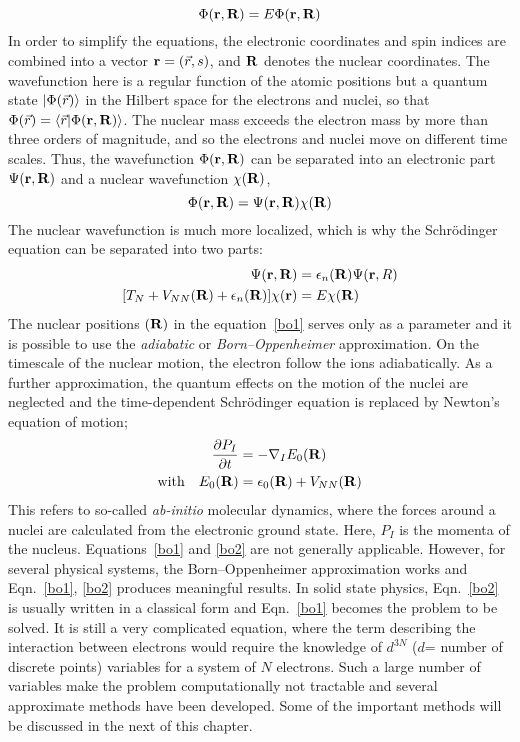 \begin{equation}
 [T_e + T_N + V_{Ne}(\vb{r},\vb{R}) + V_{ee}(\vb{r}) + V_{NN}(\vb{R})]\Phi(\vb{r},\vb{R}) = E\Phi(\vb{r},\vb{R})
\end{equation}
In order to simplify the equations, the electronic coordinates and spin indices are combined into a vector $\vb{r} = (\vec{r},s)$, and $\vb{R}$ denotes the nuclear coordinates. The wavefunction here is a regular function of the atomic positions but a quantum state $\ket{\Phi(\vec{r})}$ in the Hilbert space for the electrons and nuclei, so that \mbox{$\Phi(\vec{r}) = \braket{\vec{r}}{\Phi(\vb{r},\vb{R})}$}. The nuclear mass exceeds the electron mass by more than three orders of magnitude, and so the electrons and nuclei move on different time scales. Thus, the wavefunction $\Phi(\vb{r},\vb{R})$ can be separated into an electronic part $\Psi(\vb{r},\vb{R})$ and a nuclear wavefunction $\chi(\vb{R})$,
\begin{equation}
\Phi(\vb{r},\vb{R}) = \Psi(\vb{r},\vb{R})\chi(\vb{R})
\end{equation}
The nuclear wavefunction is much more localized, which is why the Schr\"odinger equation can be separated into two parts:
\begin{align}
[T_e + V_{ee}(\vb{r}) + V_{Ne}(\vb{r},\vb{R})]\Psi(\vb{r},\vb{R}) & = \epsilon_n(\vb{R})\Psi(\vb{r},{R})\label{bo1} \\
[T_N + V_{NN}(\vb{R}) + \epsilon_n(\vb{R})]\chi(\vb{r}) & = E\chi(\vb{R})\label{bo2}
\end{align}
The nuclear positions $(\vb{R})$ in the equation~\eqref{bo1} serves only as a parameter and it is possible to use the \textit{adiabatic} or \textit{Born--Oppenheimer} approximation. On the timescale of the nuclear motion, the electron follow the ions adiabatically. As a further approximation, the quantum effects on the motion of the nuclei are neglected and the time-dependent Schr\"odinger equation is replaced by Newton's equation of motion;
\begin{align}
\frac{\partial P_I}{\partial t} & = -\nabla_I E_0 (\vb{R}) \\
\text{with} \quad E_0(\vb{R}) & = \epsilon_0(\vb{R}) + V_{NN}(\vb{R})
\end{align}
This refers to so-called \textit{ab-initio} molecular dynamics, where the forces around a nuclei are calculated from the electronic ground state. Here, $P_I$ is the momenta of the nucleus.
Equations~\eqref{bo1} and \eqref{bo2} are not generally applicable. However, for several physical systems, the Born--Oppenheimer approximation works and Eqn.~\eqref{bo1}, \eqref{bo2} produces meaningful results. In solid state physics, Eqn.~\eqref{bo2} is usually written in a classical form and Eqn.~\eqref{bo1} becomes the problem to be solved. It is still a very complicated equation, where the term describing the interaction between electrons would require the knowledge of $d^{3N}$ ($d$= number of discrete points) variables for a system of $N$ electrons. Such a large number of variables make the problem computationally not tractable and several approximate methods have been developed. Some of the important methods will be discussed in the next of this chapter.

